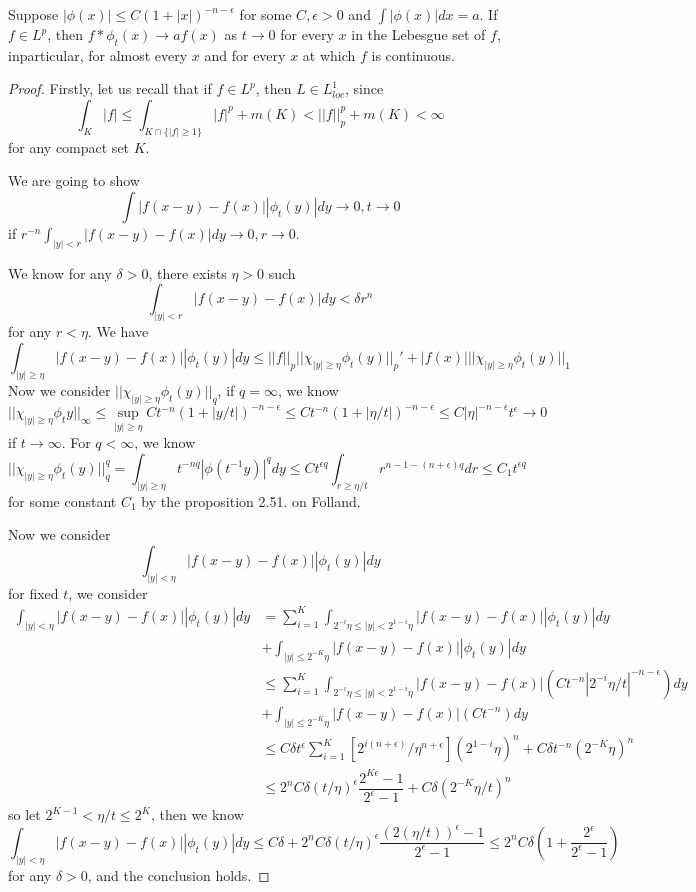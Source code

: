 \documentclass[lang=en, color=blue, ]{elegantbook}
\begin{document}
\begin{theorem}
    Suppose $|\phi(x)|\leq C(1+|x|)^{-n-\epsilon}$ for some $C,\epsilon > 0$ and $\int |\phi(x)|dx = a$. If $f\in L^p$, then $f*\phi_t(x) \to af(x)$ as $t\to 0$ for every $x$ in the Lebesgue set of $f$, inparticular, for almost every $x$ and for every $x$ at which $f$ is continuous.
\end{theorem}
\begin{proof}\par
    Firstly, let us recall that if $f\in L^p$, then $L\in L^1_{loc}$, since
    \[
    \int_K |f| \leq \int_{K\cap\{|f|\geq 1\}} |f|^p + m(K) < ||f||_p^p + m(K) < \infty
    \]
    for any compact set $K$.\par
    We are going to show
    \[
    \int |f(x-y)-f(x)||\phi_t(y)|dy \to 0, t\to 0
    \]
    if $r^{-n}\int_{|y|<r} |f(x-y)-f(x)|dy \to 0, r\to 0$.\par
    We know for any $\delta > 0$, there exists $\eta>0$ such
    \[
    \int_{|y|<r} |f(x-y)-f(x)|dy < \delta r^{n}
    \]
    for any $r<\eta$. We have
    \[
    \int_{|y|\geq \eta} |f(x-y)-f(x)||\phi_t(y)|dy \leq ||f||_p||\chi_{|y|\geq \eta}\phi_t(y)||_p' + |f(x)|||\chi_{|y|\geq\eta}\phi_t(y)||_1
    \]
    Now we consider $||\chi_{|y|\geq\eta}\phi_t(y)||_q$, if $q= \infty$, we know
    \[
    ||\chi_{|y|\geq\eta}\phi_t{y}||_{\infty} \leq \sup_{|y|\geq\eta}Ct^{-n}(1+|y/t|)^{-n-\epsilon}  \leq Ct^{-n}(1+|\eta/t|)^{-n-\epsilon} \leq C|\eta|^{-n-\epsilon}t^{\epsilon} \to 0
    \]
    if $t\to\infty$. For $q<\infty$, we know
    \[
    ||\chi_{|y|\geq\eta} \phi_t(y)||_q^q = \int_{|y|\geq\eta} t^{-nq}|\phi(t^{-1}y)|^qdy \leq Ct^{\epsilon q}\int_{r\geq\eta/t} r^{n-1-(n+\epsilon)q} dr \leq C_1t^{\epsilon q}
    \]
    for some constant $C_1$ by the proposition 2.51. on Folland.\par
    Now we consider
    \[
    \int_{|y|<\eta} |f(x-y)-f(x)||\phi_t(y)|dy
    \]
    for fixed $t$, we consider
    \[
    \begin{aligned}
    \int_{|y|<\eta} |f(x-y)-f(x)||\phi_t(y)|dy
    &= \sum\limits_{i=1}^{K}\int_{2^{-i}\eta\leq|y|<2^{1-i}\eta} |f(x-y)-f(x)||\phi_t(y)|dy \\
    &+ \int_{|y|\leq 2^{-K}\eta} |f(x-y)-f(x)||\phi_t(y)|dy \\
    &\leq \sum\limits_{i=1}^{K}\int_{2^{-i}\eta\leq|y|<2^{1-i}\eta} |f(x-y)-f(x)|(Ct^{-n}|2^{-i}\eta/t|^{-n-\epsilon})dy \\
    &+ \int_{|y|\leq 2^{-K}\eta} |f(x-y)-f(x)|(Ct^{-n})dy \\
    &\leq C\delta t^{\epsilon}\sum\limits_{i=1}^K [2^{i(n+\epsilon)}/\eta^{n+\epsilon}](2^{1-i}\eta)^n + C\delta t^{-n}(2^{-K}\eta)^n \\
    &\leq 2^nC\delta(t/\eta)^{\epsilon}\dfrac{2^{K\epsilon}-1}{2^{\epsilon}-1}+ C\delta (2^{-K}\eta/t)^n 
    \end{aligned}
    \]
    so let $2^{K-1} < \eta/t \leq 2^K$, then we know
    \[\int_{|y|<\eta} |f(x-y)-f(x)||\phi_t(y)|dy \leq C\delta + 2^nC\delta(t/\eta)^{\epsilon}\dfrac{(2(\eta/t))^{\epsilon}-1}{2^{\epsilon}-1} \leq 2^nC\delta(1+\dfrac{2^{\epsilon}}{2^{\epsilon}-1})\]
    for any $\delta > 0$, and the conclusion holds.
\end{proof}
\end{document}
